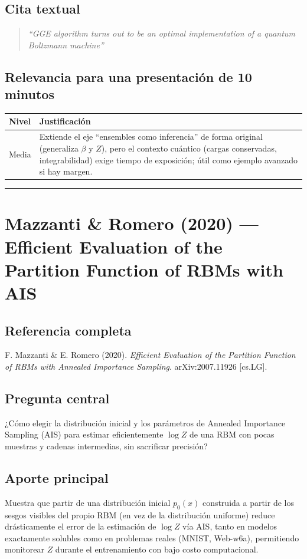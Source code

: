 \documentclass[12pt]{article}
\begin{document}
\subsection*{Cita textual}
\begin{quote}
\textit{``GGE algorithm turns out to be an optimal implementation of a quantum Boltzmann machine''}
\end{quote}

\subsection*{Relevancia para una presentación de 10 minutos}
\begin{tabular}{@{}p{2cm}p{11.5cm}@{}}
\toprule
\textbf{Nivel} & \textbf{Justificación} \\
\midrule
Media & Extiende el eje ``ensembles como inferencia'' de forma original (generaliza $\beta$ y $Z$), pero el contexto cuántico (cargas conservadas, integrabilidad) exige tiempo de exposición; útil como ejemplo avanzado si hay margen. \\
\bottomrule
\end{tabular}

\bigskip
\hrule
\bigskip

\section{Mazzanti \& Romero (2020) --- Efficient Evaluation of the Partition Function of RBMs with AIS}

\subsection*{Referencia completa}
F. Mazzanti \& E. Romero (2020). \textit{Efficient Evaluation of the Partition Function of
RBMs with Annealed Importance Sampling}. arXiv:2007.11926 [cs.LG]. \cite{mazzanti2020}

\subsection*{Pregunta central}
¿Cómo elegir la distribución inicial y los parámetros de Annealed Importance Sampling (AIS)
para estimar eficientemente $\log Z$ de una RBM con pocas muestras y cadenas intermedias, sin
sacrificar precisión?

\subsection*{Aporte principal}
Muestra que partir de una distribución inicial $p_0(x)$ construida a partir de los sesgos
visibles del propio RBM (en vez de la distribución uniforme) reduce drásticamente el error de
la estimación de $\log Z$ vía AIS, tanto en modelos exactamente solubles como en problemas
reales (MNIST, Web-w6a), permitiendo monitorear $Z$ durante el entrenamiento con bajo costo
computacional.
\end{document}
